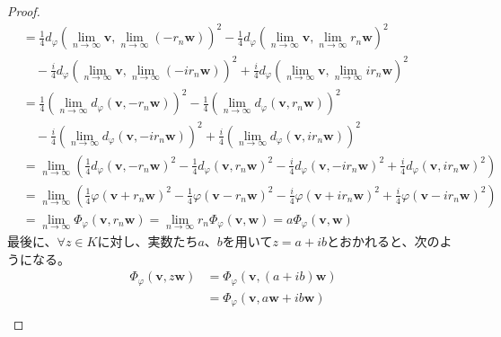 \documentclass[dvipdfmx]{jsarticle}
\begin{document}
\begin{proof}
\begin{align*}
&= \frac{1}{4}{d_{\varphi}\left( \lim_{n \rightarrow \infty}\mathbf{v},\lim_{n \rightarrow \infty}\left( - r_{n}\mathbf{w} \right) \right)}^{2} - \frac{1}{4}{d_{\varphi}\left( \lim_{n \rightarrow \infty}\mathbf{v},\lim_{n \rightarrow \infty}{r_{n}\mathbf{w}} \right)}^{2} \\
&\quad - \frac{i}{4}{d_{\varphi}\left( \lim_{n \rightarrow \infty}\mathbf{v},\lim_{n \rightarrow \infty}\left( - ir_{n}\mathbf{w} \right) \right)}^{2} + \frac{i}{4}{d_{\varphi}\left( \lim_{n \rightarrow \infty}\mathbf{v},\lim_{n \rightarrow \infty}{ir_{n}\mathbf{w}} \right)}^{2}\\
&= \frac{1}{4}\left( \lim_{n \rightarrow \infty}{d_{\varphi}\left( \mathbf{v}, - r_{n}\mathbf{w} \right)} \right)^{2} - \frac{1}{4}\left( \lim_{n \rightarrow \infty}{d_{\varphi}\left( \mathbf{v},r_{n}\mathbf{w} \right)} \right)^{2} \\
&\quad - \frac{i}{4}\left( \lim_{n \rightarrow \infty}{d_{\varphi}\left( \mathbf{v}, - ir_{n}\mathbf{w} \right)} \right)^{2} + \frac{i}{4}\left( \lim_{n \rightarrow \infty}{d_{\varphi}\left( \mathbf{v},ir_{n}\mathbf{w} \right)} \right)^{2}\\
&= \lim_{n \rightarrow \infty}\left( \frac{1}{4}{d_{\varphi}\left( \mathbf{v}, - r_{n}\mathbf{w} \right)}^{2} - \frac{1}{4}{d_{\varphi}\left( \mathbf{v},r_{n}\mathbf{w} \right)}^{2} - \frac{i}{4}{d_{\varphi}\left( \mathbf{v}, - ir_{n}\mathbf{w} \right)}^{2} + \frac{i}{4}{d_{\varphi}\left( \mathbf{v},ir_{n}\mathbf{w} \right)}^{2} \right)\\
&= \lim_{n \rightarrow \infty}\left( \frac{1}{4}{\varphi\left( \mathbf{v} + r_{n}\mathbf{w} \right)}^{2} - \frac{1}{4}{\varphi\left( \mathbf{v} - r_{n}\mathbf{w} \right)}^{2} - \frac{i}{4}{\varphi\left( \mathbf{v} + ir_{n}\mathbf{w} \right)}^{2} + \frac{i}{4}{\varphi\left( \mathbf{v} - ir_{n}\mathbf{w} \right)}^{2} \right)\\
&= \lim_{n \rightarrow \infty}{\varPhi_{\varphi}\left( \mathbf{v},r_{n}\mathbf{w} \right)} = \lim_{n \rightarrow \infty}{r_{n}\varPhi_{\varphi}\left( \mathbf{v},\mathbf{w} \right)} = a\varPhi_{\varphi}\left( \mathbf{v},\mathbf{w} \right)
\end{align*}
最後に、$\forall z \in K$に対し、実数たち$a$、$b$を用いて$z = a + ib$とおかれると、次のようになる。
\begin{align*}
\varPhi_{\varphi}\left( \mathbf{v},z\mathbf{w} \right) &= \varPhi_{\varphi}\left( \mathbf{v},(a + ib)\mathbf{w} \right)\\
&= \varPhi_{\varphi}\left( \mathbf{v},a\mathbf{w} + ib\mathbf{w} \right)\\

\end{align*}
\end{proof}
\end{document}
